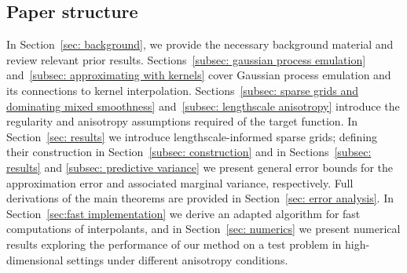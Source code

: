\documentclass[pdflatex,sn-mathphys-num]{sn-jnl}%
\theoremstyle{thmstyleone}%
\theoremstyle{thmstyletwo}%
\theoremstyle{thmstylethree}%
\begin{document}
\subsection*{Paper structure}

In Section~\ref{sec: background}, we provide the necessary background material and review relevant prior results. Sections~\ref{subsec: gaussian process emulation} and~\ref{subsec: approximating with kernels} cover Gaussian process emulation and its connections to kernel interpolation. Sections~\ref{subsec: sparse grids and dominating mixed smoothness} and~\ref{subsec: lengthscale anisotropy} introduce the regularity and anisotropy assumptions required of the target function. In Section~\ref{sec: results} we introduce lengthscale-informed sparse grids; defining their construction in Section~\ref{subsec: construction} and in Sections~\ref{subsec: results} and \ref{subsec: predictive variance} we present general error bounds for the approximation error and associated marginal variance, respectively. Full derivations of the main theorems are provided in Section~\ref{sec: error analysis}. In Section~\ref{sec:fast implementation} we derive an adapted algorithm for fast computations of interpolants, and in Section~\ref{sec: numerics} we present numerical results exploring the performance of our method on a test problem in high-dimensional settings under different anisotropy conditions.
\end{document}
